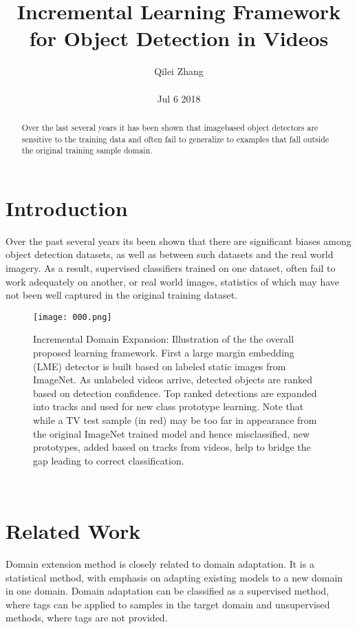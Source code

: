 \documentclass[30pt,twocolumn,letterpaper]{article}
\author{Qilei Zhang\\\\
Jul 6 2018}
\title{Incremental Learning Framework for Object Detection in Videos}
\begin{document}
\maketitle
\begin{abstract}
  Over the last several years it has been shown that imagebased object detectors are sensitive to the training data and often fail to generalize to examples that fall outside the original training sample domain.
\end{abstract}
\section{Introduction}
Over the past several years its been shown that there are significant biases among object detection datasets, as well as between such datasets and the real world imagery\cite{Bang1999New}. As a result, supervised classifiers trained on one dataset, often fail to work adequately on another, or real world images, statistics of which may have not been well captured in the original training dataset. \\
\begin{figure}[htbp]
\small
\centering
\texttt{[image: 000.png]}
\caption{Incremental Domain Expansion: Illustration of the the
overall proposed learning framework. First a large margin embedding
(LME) detector is built based on labeled static images
from ImageNet. As unlabeled videos arrive, detected objects are
ranked based on detection confidence. Top ranked detections are
expanded into tracks and used for new class prototype learning.
Note that while a TV test sample (in red) may be too far in appearance
from the original ImageNet trained model and hence misclassified,
new prototypes, added based on tracks from videos, help to
bridge the gap leading to correct classification.
}
\label{fig:lable}
\end{figure}\\
\section{Related Work}
Domain extension method is closely related to domain adaptation. It is a statistical method, with emphasis on adapting existing models to a new domain in one domain. Domain adaptation can be classified as a supervised method, where tags can be applied to samples in the target domain and unsupervised methods, where tags are not provided\cite{Ferilli2013A}.\\
\end{document}
